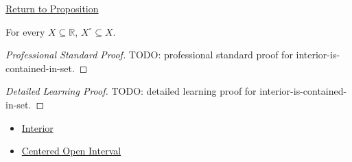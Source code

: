 \newpage
{}
\label{prf:interior-is-contained-in-set}

\begin{remark*}[Return]
\hyperref[prop:interior-is-contained-in-set]{Return to Proposition}
\end{remark*}

\begin{proposition*}
For every \(X\subseteq\mathbb{R}\), \(X^\circ\subseteq X\).
\end{proposition*}

\begin{proof}[Professional Standard Proof]
\LRAProofBodyStart
TODO: professional standard proof for interior-is-contained-in-set.
\end{proof}

\begin{proof}[Detailed Learning Proof]
\LRAProofBodyStart
TODO: detailed learning proof for interior-is-contained-in-set.
\end{proof}

\begin{remark*}
\end{remark*}

\begin{dependencies}
\begin{itemize}
  \item \hyperref[def:interior-r]{Interior}
  \item \hyperref[def:epsilon-neighbourhood]{Centered Open Interval}
\end{itemize}
\end{dependencies}

\clearpage
